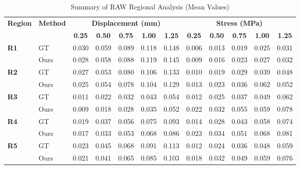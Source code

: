 \documentclass{article}
\begin{document}
\thispagestyle{empty}

\begin{table}[h]
\centering
\caption{Summary of RAW Regional Analysis (Mean Values)}
\vspace{0.3cm}
\begin{tabular}{llcccccccccc}
\toprule
\multirow{2}{*}{\textbf{Region}} & \multirow{2}{*}{\textbf{Method}} & \multicolumn{5}{c}{\textbf{Displacement (mm)}} & \multicolumn{5}{c}{\textbf{Stress (MPa)}} \\
\cmidrule(lr){3-7} \cmidrule(lr){8-12}
& & \textbf{0.25} & \textbf{0.50} & \textbf{0.75} & \textbf{1.00} & \textbf{1.25} & \textbf{0.25} & \textbf{0.50} & \textbf{0.75} & \textbf{1.00} & \textbf{1.25} \\
\midrule
\multirow{2}{*}{\textbf{R1}} & GT  & 0.030 & 0.059 & 0.089 & 0.118 & 0.148 & 0.006 & 0.013 & 0.019 & 0.025 & 0.031 \\
 & Ours  & 0.028 & 0.058 & 0.088 & 0.119 & 0.145 & 0.009 & 0.016 & 0.023 & 0.027 & 0.032 \\ \midrule
\multirow{2}{*}{\textbf{R2}} & GT  & 0.027 & 0.053 & 0.080 & 0.106 & 0.133 & 0.010 & 0.019 & 0.029 & 0.039 & 0.048 \\
 & Ours  & 0.025 & 0.054 & 0.078 & 0.104 & 0.129 & 0.013 & 0.023 & 0.036 & 0.062 & 0.052 \\ \midrule
\multirow{2}{*}{\textbf{R3}} & GT  & 0.011 & 0.022 & 0.032 & 0.043 & 0.054 & 0.012 & 0.025 & 0.037 & 0.049 & 0.062 \\
 & Ours  & 0.009 & 0.018 & 0.028 & 0.035 & 0.052 & 0.022 & 0.032 & 0.055 & 0.059 & 0.078 \\ \midrule
\multirow{2}{*}{\textbf{R4}} & GT  & 0.019 & 0.037 & 0.056 & 0.075 & 0.093 & 0.014 & 0.028 & 0.043 & 0.058 & 0.074 \\
 & Ours  & 0.017 & 0.033 & 0.053 & 0.068 & 0.086 & 0.023 & 0.034 & 0.051 & 0.068 & 0.081 \\ \midrule
\multirow{2}{*}{\textbf{R5}} & GT  & 0.023 & 0.045 & 0.068 & 0.091 & 0.113 & 0.012 & 0.024 & 0.036 & 0.048 & 0.059 \\
 & Ours  & 0.021 & 0.041 & 0.065 & 0.085 & 0.103 & 0.018 & 0.032 & 0.049 & 0.059 & 0.076 \\
\bottomrule
\end{tabular}
\end{table}
\end{document}

